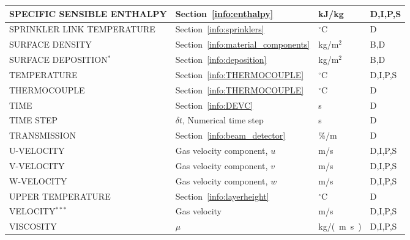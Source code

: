 \documentclass[11pt]{book}
\begin{document}
\begin{longtable}{@{\extracolsep{\fill}}|l|l|l|l|}
{\ct SPECIFIC SENSIBLE ENTHALPY}                & Section~\ref{info:enthalpy}                   & kJ/kg          & D,I,P,S      \\ \hline
{\ct SPRINKLER LINK TEMPERATURE}                & Section~\ref{info:sprinklers}                 & $^\circ$C      & D            \\ \hline
{\ct SURFACE DENSITY}                           & Section~\ref{info:material_components}        & kg/m$^2$       & B,D          \\ \hline
{\ct SURFACE DEPOSITION}$^*$                    & Section~\ref{info:deposition}                 & kg/m$^2$       & B,D          \\ \hline
{\ct TEMPERATURE}                               & Section~\ref{info:THERMOCOUPLE}               & $^\circ$C      & D,I,P,S      \\ \hline
{\ct THERMOCOUPLE}                              & Section~\ref{info:THERMOCOUPLE}               & $^\circ$C      & D            \\ \hline
{\ct TIME}                                      & Section~\ref{info:DEVC}                       & s              & D            \\ \hline
{\ct TIME STEP}                                 & $\delta t$, Numerical time step               & s              & D            \\ \hline
{\ct TRANSMISSION}                              & Section~\ref{info:beam_detector}              & \%/m           & D            \\ \hline
{\ct U-VELOCITY}                                & Gas velocity component, $u$                   & m/s            & D,I,P,S      \\ \hline
{\ct V-VELOCITY}                                & Gas velocity component, $v$                   & m/s            & D,I,P,S      \\ \hline
{\ct W-VELOCITY}                                & Gas velocity component, $w$                   & m/s            & D,I,P,S      \\ \hline
{\ct UPPER TEMPERATURE}                         & Section~\ref{info:layerheight}                & $^\circ$C      & D            \\ \hline
{\ct VELOCITY}$^{***}$                          & Gas velocity                                  & m/s            & D,I,P,S      \\ \hline
{\ct VISCOSITY}                                 & $\mu$                                         & \si{kg/(m.s)}  & D,I,P,S      \\ \hline

\end{longtable}
\end{document}
